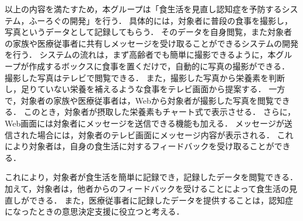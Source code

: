 \documentclass[../report]{subfiles}
\begin{document}
以上の内容を満たすため，本グループは「食生活を見直し認知症を予防するシステム，ふーろぐの開発」を行う．
具体的には，対象者に普段の食事を撮影し，写真というデータとして記録してもらう．
そのデータを自身閲覧，また対象者の家族や医療従事者に共有しメッセージを受け取ることができるシステムの開発を行う．
システムの流れは，まず高齢者でも簡単に撮影できるように，本グループが作成するボックスに食事を置くだけで，自動的に写真の撮影ができる．
撮影した写真はテレビで閲覧できる．
また，撮影した写真から栄養素を判断し，足りていない栄養を補えるような食事をテレビ画面から提案する．
一方で，対象者の家族や医療従事者は，Webから対象者が撮影した写真を閲覧できる．
このとき，対象者が摂取した栄養素もチャート式で表示させる．
さらに，Web画面には対象者にメッセージを送信できる機能も加える．
メッセージが送信された場合には，対象者のテレビ画面にメッセージ内容が表示される．
これにより対象者は，自身の食生活に対するフィードバックを受け取ることができる．

これにより，対象者が食生活を簡単に記録でき，記録したデータを閲覧できる．加えて，対象者は，他者からのフィードバックを受けることによって食生活の見直しができる．
また，医療従事者に記録したデータを提供することは，認知症になったときの意思決定支援に役立つと考える．
\end{document}
